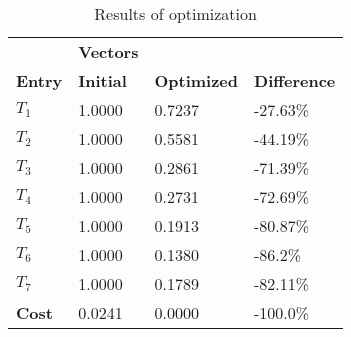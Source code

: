 \begin{table}[H]
\centering
\begin{tabular}{llll}
\textbf{}      & \cellcolor[HTML]{EFEFEF}\textbf{Vectors} & \textbf{} & \textbf{}         \\
\rowcolor[HTML]{EFEFEF} 
\textbf{Entry} & \textbf{Initial} & \textbf{Optimized} & \textbf{Difference} \\
$T_1$ & 1.0000 & 0.7237 & -27.63\% \\ 
$T_2$ & 1.0000 & 0.5581 & -44.19\% \\ 
$T_3$ & 1.0000 & 0.2861 & -71.39\% \\ 
$T_4$ & 1.0000 & 0.2731 & -72.69\% \\ 
$T_5$ & 1.0000 & 0.1913 & -80.87\% \\ 
$T_6$ & 1.0000 & 0.1380 & -86.2\% \\ 
$T_7$ & 1.0000 & 0.1789 & -82.11\% \\ 
\rowcolor[HTML]{EFEFEF} 
\textbf{Cost}  & 0.0241 & 0.0000 & -100.0\% \\ 
\end{tabular}
\caption{Results of optimization}
\label{tab:OptimizationAnalysis}
\end{table}